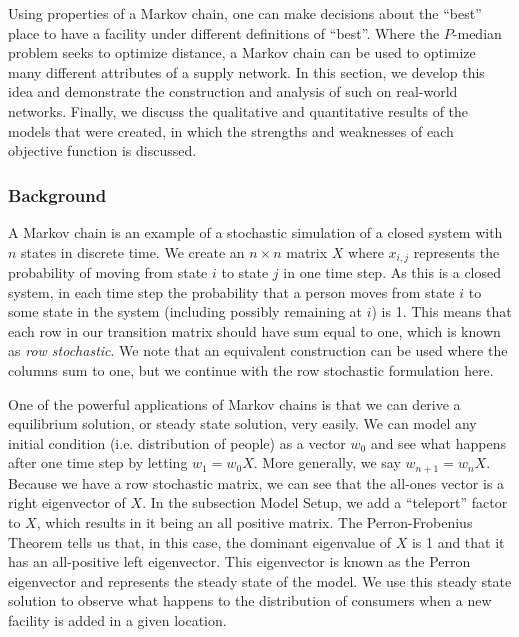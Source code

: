 \documentclass[twoside,twocolumn]{article}
\begin{document}
Using properties of a Markov chain, one can make decisions about the ``best'' place to have a facility under different definitions of ``best''.
Where the $P$-median problem seeks to optimize distance, a Markov chain can be used to optimize many different attributes of a supply network.
In this section, we develop this idea and demonstrate the construction and analysis of such on real-world networks.
Finally, we discuss the qualitative and quantitative results of the models that were created, in which the strengths and weaknesses of each objective function is discussed.

\subsubsection{Background}

A Markov chain is an example of a stochastic simulation of a closed system with $n$ states in discrete time.
We create an $n\times n$ matrix $X$ where $x_{i,j}$ represents the probability of moving from state $i$ to state $j$ in one time step.
As this is a closed system, in each time step the probability that a person moves from state $i$ to some state in the system (including possibly remaining at $i$) is 1. 
This means that each row in our transition matrix should have sum equal to one, which is known as {\em row stochastic}.
We note that an equivalent construction can be used where the columns sum to one, but we continue with the row stochastic formulation here.%

One of the powerful applications of Markov chains is that we can derive a equilibrium solution, or steady state solution, very easily. %
We can model any initial condition (i.e. distribution of people) as a vector $w_0$ and see what happens after one time step by letting $w_1 = w_0 X$.
More generally, we say $w_{n + 1} = w_n X$.
Because we have a row stochastic matrix, we can see that the all-ones vector is a right eigenvector of $X$.
In the subsection Model Setup, we add a ``teleport'' factor to $X$, which results in it being an all positive matrix.
The Perron-Frobenius Theorem tells us that, in this case, the dominant eigenvalue of $X$ is 1 and that it has an all-positive left eigenvector.
This eigenvector is known as the Perron eigenvector and represents the steady state of the model. %
We use this steady state solution to observe what happens to the distribution of consumers when a new facility is added in a given location.
\end{document}
